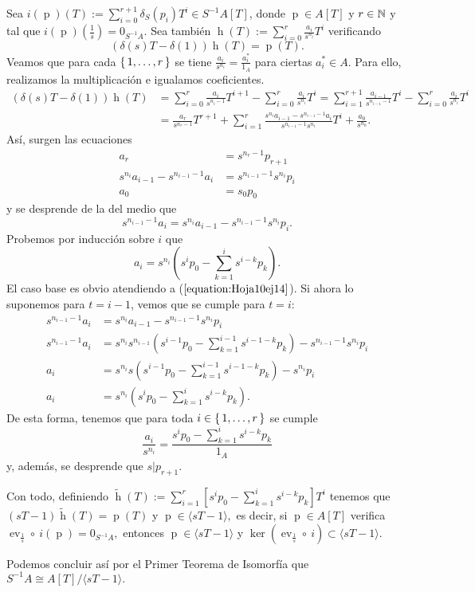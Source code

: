 \documentclass[./ejercicios.tex]{subfiles}
\begin{document}
Sea $i(\operatorname{p})(T):=\sum_{i=0}^{r+1}\delta_S(p_i)T^i\in S^{-1}A[T]$, donde $\operatorname{p}\in A[T]$ y $r\in\mathbb{N}$ y tal que $i(\operatorname{p})(\frac{1}{s})=0_{S^{-1}A}.$ Sea también $\operatorname{h}(T):=\sum_{i=0}^r\frac{a_i}{s^{n_i}}T^i$ verificando
$$(\delta(s)T-\delta(1))\operatorname{h}(T)=\operatorname{p}(T).$$
Veamos que para cada $\set{1,\dots, r}$ se tiene $\frac{a_i}{s^{n_i}}=\frac{a^*_i}{1_A}$ para ciertas $a^*_i\in A$. Para ello, realizamos la multiplicación e igualamos coeficientes.
\begin{equation}
\begin{split}
(\delta(s)T-\delta(1))\operatorname{h}(T)&=\sum_{i=0}^{r}\frac{a_i}{s^{n_i-1}}T^{i+1}-\sum_{i=0}^r\frac{a_i}{s^{n_i}}T^i=\sum_{i=1}^{r+1}\frac{a_{i-1}}{s^{n_{i-1}-1}}T^{i}-\sum_{i=0}^r\frac{a_i}{s^{n_i}}T^i\\
&=\frac{a_r}{s^{n_r-1}}T^{r+1}+\sum_{i=1}^r\frac{s^{n_i}a_{i-1}-s^{n_{i-1}-1}a_{i}}{s^{n_{i-1}-1}s^{n_i}}T^{i}+\frac{a_0}{s^{n_0}}.
\end{split}
\end{equation}
Así, surgen las ecuaciones
\begin{equation}\label{equation:Hoja10ej14}
\begin{split}
a_r&=s^{n_r-1}p_{r+1}\\
s^{n_i}a_{i-1}-s^{n_{i-1}-1}a_{i}&=s^{n_{i-1}-1}s^{n_i}p_i\\
a_0&=s_0p_0
\end{split}
\end{equation}
y se desprende de la del medio que
$$s^{n_{i-1}-1}a_i=s^{n_i}a_{i-1}-s^{n_{i-1}-1}s^{n_i}p_i.$$
Probemos por inducción sobre $i$ que
$$a_i=s^{n_i}(s^ip_0-\sum_{k=1}^is^{i-k}p_k).$$
El caso base es obvio atendiendo a ($\ref{equation:Hoja10ej14}$). Si ahora lo suponemos para $t=i-1$, vemos que se cumple para $t=i$:
\begin{equation}
\begin{split}
s^{n_{i-1}-1}a_i&=s^{n_i}a_{i-1}-s^{n_{i-1}-1}s^{n_i}p_i\\
s^{n_{i-1}-1}a_i&=s^{n_i}s^{n_{i-1}}(s^{i-1}p_0-\sum_{k=1}^{i-1}s^{i-1-k}p_k)-s^{n_{i-1}-1}s^{n_i}p_i\\
a_i&=s^{n_i}s(s^{i-1}p_0-\sum_{k=1}^{i-1}s^{i-1-k}p_k)-s^{n_i}p_i\\
a_i&=s^{n_i}(s^ip_0-\sum_{k=1}^is^{i-k}p_k).
\end{split}
\end{equation}
De esta forma, tenemos que para toda $i\in\set{1,\dots, r}$ se cumple
$$\frac{a_i}{s^{n_i}}=\frac{s^ip_0-\sum_{k=1}^is^{i-k}p_k}{1_A}$$
y, además, se desprende que $s|p_{r+1}.$

Con todo, definiendo $\widetilde{\operatorname{h}}(T):=\sum_{i=1}^r\left[s^ip_0-\sum_{k=1}^is^{i-k}p_k\right]T^i$ tenemos que $(sT-1)\widetilde{\operatorname{h}}(T)=\operatorname{p}(T)$ y $\operatorname{p}\in\langle sT-1\rangle,$ es decir, si $\operatorname{p}\in A[T]$ verifica $\operatorname{ev}_{\frac{1}{s}}\circ\ i(\operatorname{p})=0_{S^{-1}A},$ entonces $\operatorname{p}\in \langle sT-1\rangle$ y $\ker(\operatorname{ev}_{\frac{1}{s}}\circ\ i)\subset\langle sT-1\rangle.$

Podemos concluir así por el Primer Teorema de Isomorfía que $S^{-1}A\cong A[T]/\langle sT-1\rangle.$
\end{document}
